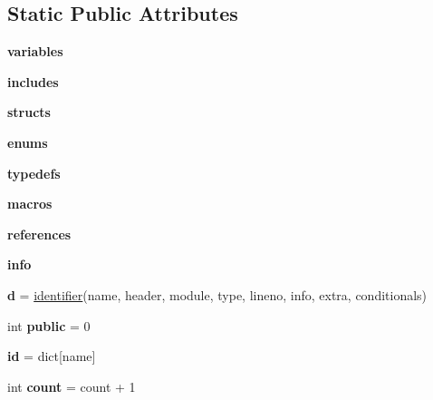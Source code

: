 \subsection*{Static Public Attributes}
\begin{DoxyCompactItemize}
\item 
\mbox{\label{classapibuild_1_1index_a5db43386c881b06441037fe8ffbadeb9}} 
{\bfseries variables}
\item 
\mbox{\label{classapibuild_1_1index_a67744d83d3032e5b9f001093fe132639}} 
{\bfseries includes}
\item 
\mbox{\label{classapibuild_1_1index_a0efcbd684150d16322e67fd208fd5304}} 
{\bfseries structs}
\item 
\mbox{\label{classapibuild_1_1index_a6351872885145a61fa54de99988e73ae}} 
{\bfseries enums}
\item 
\mbox{\label{classapibuild_1_1index_a27aef37625ca82cd473a62c4cdb083fd}} 
{\bfseries typedefs}
\item 
\mbox{\label{classapibuild_1_1index_a2b9a7363ad069f8051c34deb9af2bacf}} 
{\bfseries macros}
\item 
\mbox{\label{classapibuild_1_1index_ae3b0c2de8dde259c1a89821e07b118e4}} 
{\bfseries references}
\item 
\mbox{\label{classapibuild_1_1index_a0027952d3622c416758b985a6d31b6b6}} 
{\bfseries info}
\item 
\mbox{\label{classapibuild_1_1index_a5998b3d37a31393fdc5092920bcde8fa}} 
{\bfseries d} = \mbox{\hyperlink{classapibuild_1_1identifier}{identifier}}(name, header, module, type, lineno, info, extra, conditionals)
\item 
\mbox{\label{classapibuild_1_1index_a8a276571707f63275a7aa28de0bbc738}} 
int {\bfseries public} = 0
\item 
\mbox{\label{classapibuild_1_1index_aff19ebe51ee751044e55c418b5bef2a4}} 
{\bfseries id} = dict\mbox{[}name\mbox{]}
\item 
\mbox{\label{classapibuild_1_1index_aebbdb16eddd896658963c6344394856e}} 
int {\bfseries count} = count + 1
\end{DoxyCompactItemize}


